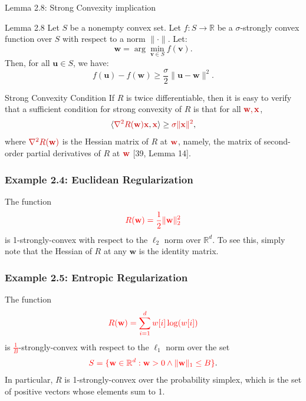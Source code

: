 \documentclass[handout]{beamer}
\newcommand{\redmath}[1]{\textcolor{mathred}{#1}}
\begin{document}
\begin{small}
\begin{frame}{Lemma 2.8: Strong Convexity implication}
    \begin{block}{Lemma 2.8}
        Let \( S \) be a nonempty convex set. Let \( f: S \to \mathbb{R} \) be a \( \sigma \)-strongly convex function over \( S \) with respect to a norm \( \|\cdot\| \). Let:
        \[
        \mathbf{w} = \arg\min_{\mathbf{v} \in S} f(\mathbf{v}).
        \]
        Then, for all \( \mathbf{u} \in S \), we have:
        \begin{equation*}
            f(\mathbf{u}) - f(\mathbf{w}) \geq \frac{\sigma}{2} \|\mathbf{u} - \mathbf{w}\|^2.
          \end{equation*}
    \end{block}
\end{frame}

\begin{frame}{Strong Convexity Condition}
    If \( R \) is twice differentiable, then it is easy to verify that a sufficient condition for strong convexity of \( R \) is that for all \( \redmath{\mathbf{w}, \mathbf{x}} \),
    \[
    \langle \redmath{\nabla^2 R(\mathbf{w}) \mathbf{x}}, \redmath{\mathbf{x}} \rangle \geq \redmath{\sigma \|\mathbf{x}\|^2},
    \]
    where \( \redmath{\nabla^2 R(\mathbf{w})} \) is the Hessian matrix of \( R \) at \( \redmath{\mathbf{w}} \), namely, the matrix of second-order partial derivatives of \( R \) at \( \redmath{\mathbf{w}} \) [39, Lemma 14].
\end{frame}


\begin{frame}
    \frametitle{Example 2.4: Euclidean Regularization}
    The function 
    \[
    \textcolor{red}{R(\mathbf{w}) = \frac{1}{2} \|\mathbf{w}\|_2^2}
    \]
    is 1-strongly-convex with respect to the $\ell_2$ norm over $\mathbb{R}^d$. To see this, simply note that the Hessian of $R$ at any $\mathbf{w}$ is the identity matrix.
\end{frame}

\begin{frame}
    \frametitle{Example 2.5: Entropic Regularization}
    The function 
    \[
    \textcolor{red}{R(\mathbf{w}) = \sum_{i=1}^{d} w[i] \log(w[i])}
    \]
    is \textcolor{red}{$\frac{1}{B}$}-strongly-convex with respect to the $\ell_1$ norm over the set 
    \[
    \textcolor{red}{S = \{\mathbf{w} \in \mathbb{R}^d : \mathbf{w} > 0 \wedge \|\mathbf{w}\|_1 \leq B\}}.
    \]
    In particular, $R$ is 1-strongly-convex over the probability simplex, which is the set of positive vectors whose elements sum to 1.
\end{frame}


\end{small}
\end{document}
